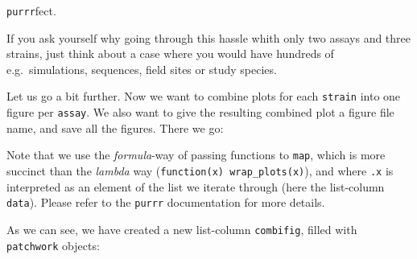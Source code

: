 \documentclass[]{book}
\newenvironment{Shaded}{}{}
\newcommand{\CommentTok}[1]{\textcolor[rgb]{0.38,0.63,0.69}{\textit{#1}}}
\newcommand{\DataTypeTok}[1]{\textcolor[rgb]{0.56,0.13,0.00}{#1}}
\newcommand{\DecValTok}[1]{\textcolor[rgb]{0.25,0.63,0.44}{#1}}
\newcommand{\KeywordTok}[1]{\textcolor[rgb]{0.00,0.44,0.13}{\textbf{#1}}}
\newcommand{\NormalTok}[1]{#1}
\newcommand{\OperatorTok}[1]{\textcolor[rgb]{0.40,0.40,0.40}{#1}}
\newcommand{\StringTok}[1]{\textcolor[rgb]{0.25,0.44,0.63}{#1}}
\begin{document}
\texttt{purrr}fect.

If you ask yourself why going through this hassle whith only two assays and three strains, just think about a case where you would have hundreds of e.g.~simulations, sequences, field sites or study species.

Let us go a bit further. Now we want to combine plots for each \texttt{strain} into one figure per \texttt{assay}. We also want to give the resulting combined plot a figure file name, and save all the figures. There we go:

\begin{Shaded}
\end{Shaded}

Note that we use the \emph{formula}-way of passing functions to \texttt{map}, which is more succinct than the \emph{lambda} way (\texttt{function(x)\ wrap\_plots(x)}), and where \texttt{.x} is interpreted as an element of the list we iterate through (here the list-column \texttt{data}). Please refer to the \texttt{purrr} documentation for more details.

As we can see, we have created a new list-column \texttt{combifig}, filled with \texttt{patchwork} objects:

\begin{Shaded}
\end{Shaded}
\end{document}
